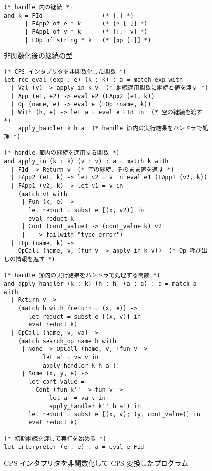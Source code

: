 
\begin{figure}
\begin{verbatim}
(* handle 内の継続 *)
and k = FId                 (* [.] *)
      | FApp2 of e * k      (* [e [.]] *)
      | FApp1 of v * k      (* [[.] v] *)
      | FOp of string * k   (* [op [.]] *)
\end{verbatim}
\caption{非関数化後の継続の型}
\label{figure:k_2defun}
\end{figure}

\begin{figure}
\begin{verbatim}
(* CPS インタプリタを非関数化した関数 *)
let rec eval (exp : e) (k : k) : a = match exp with
  | Val (v) -> apply_in k v  (* 継続適用関数に継続と値を渡す *)
  | App (e1, e2) -> eval e2 (FApp2 (e1, k))
  | Op (name, e) -> eval e (FOp (name, k))
  | With (h, e) -> let a = eval e FId in  (* 空の継続を渡す *)
    apply_handler k h a  (* handle 節内の実行結果をハンドラで処理 *)

(* handle 節内の継続を適用する関数 *)
and apply_in (k : k) (v : v) : a = match k with
  | FId -> Return v  (* 空の継続、そのまま値を返す *)
  | FApp2 (e1, k) -> let v2 = v in eval e1 (FApp1 (v2, k))
  | FApp1 (v2, k) -> let v1 = v in
    (match v1 with
     | Fun (x, e) ->
       let reduct = subst e [(x, v2)] in
       eval reduct k
     | Cont (cont_value) -> (cont_value k) v2
     | _ -> failwith "type error")
  | FOp (name, k) ->
    OpCall (name, v, (fun v -> apply_in k v))  (* Op 呼び出しの情報を返す *)

(* handle 節内の実行結果をハンドラで処理する関数 *)
and apply_handler (k : k) (h : h) (a : a) : a = match a with
  | Return v ->
    (match h with {return = (x, e)} ->
       let reduct = subst e [(x, v)] in
       eval reduct k)
  | OpCall (name, v, va) ->
    (match search_op name h with
     | None -> OpCall (name, v, (fun v ->
           let a' = va v in
           apply_handler k h a'))
     | Some (x, y, e) ->
       let cont_value =
         Cont (fun k'' -> fun v ->
             let a' = va v in
             apply_handler k'' h a') in
       let reduct = subst e [(x, v); (y, cont_value)] in
       eval reduct k)

(* 初期継続を渡して実行を始める *)
let interpreter (e : e) : a = eval e FId
\end{verbatim}
\caption{CPS インタプリタを非関数化して CPS 変換したプログラム}
\label{figure:2defun}
\end{figure}

